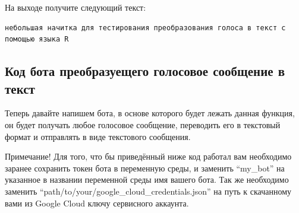 \documentclass[
]{book}
\begin{document}
На выходе получите следующий текст:

\begin{verbatim}
небольшая начитка для тестирования преобразования голоса в текст с помощью языка R
\end{verbatim}

\subsection{Код бота преобразуещего голосовое сообщение в текст}\label{ux43aux43eux434-ux431ux43eux442ux430-ux43fux440ux435ux43eux431ux440ux430ux437ux443ux435ux449ux435ux433ux43e-ux433ux43eux43bux43eux441ux43eux432ux43eux435-ux441ux43eux43eux431ux449ux435ux43dux438ux435-ux432-ux442ux435ux43aux441ux442}

Теперь давайте напишем бота, в основе которого будет лежать данная функция, он будет получать любое голосовое сообщение, переводить его в текстовый формат и отправлять в виде текстового сообщения.

Примечание! Для того, что бы приведённый ниже код работал вам необходимо заранее сохранить токен бота в переменную среды, и заменить ``my\_bot'' на указанное в названии переменной среды имя вашего бота. Так же необходимо заменить ``path/to/your/google\_cloud\_credentials.json'' на путь к скачанному вами из Google Cloud ключу сервисного аккаунта.
\end{document}
